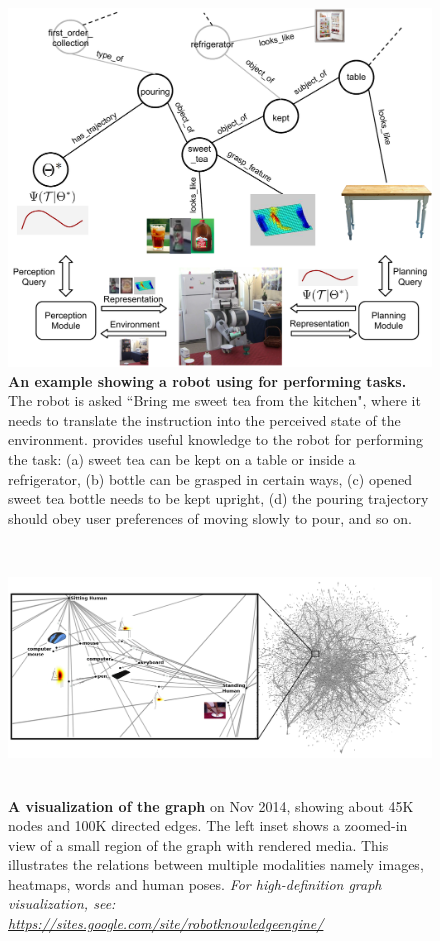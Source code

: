  \begin{figure}
 \centering
\includegraphics[width=\linewidth]{Image/cover_picture_graph}
 \caption{\textbf{An example showing a robot using \robobrain{} for performing tasks.}  The robot is asked ``Bring me sweet tea from the kitchen", where
 it needs to translate the instruction into the perceived state of the environment.
\robobrain{} provides useful knowledge to the robot for performing the task:
 (a) sweet tea can be kept on a table or inside a refrigerator,
 (b) bottle can be grasped in certain ways,
 (c) opened sweet tea bottle needs to be kept upright,
 (d) the pouring trajectory should obey user preferences of moving slowly to pour, and
 so on.
 }
 \label{fig:intro}
 \end{figure}

\begin{figure}[t]
\centering
\includegraphics[width=.95\linewidth, height=2.6in, clip=true, trim=0 40 0 0]{Image/RBgraph}
\caption{\textbf{A visualization of the \robobrain{} graph} on Nov 2014, showing about 45K nodes and 100K directed edges.
The left inset shows a zoomed-in view of a small region of the graph with rendered media. This illustrates the relations between multiple modalities namely images, heatmaps, words and human poses. \textit{For high-definition graph visualization, see: \url{https://sites.google.com/site/robotknowledgeengine/}}}
\label{fig:graph}
\end{figure}


